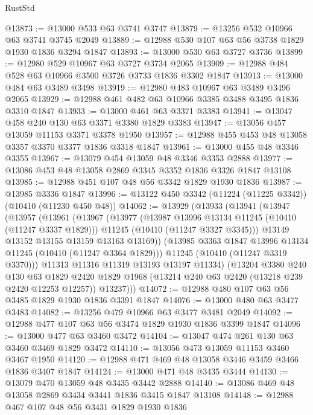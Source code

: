 \begin{lexlean}{RustStd}
\begin{coremodule}
@13873 := @13000 @533 @63 @3741 @3747
@13879 := @13256 @532 @10966 @63 @3741 @3745 @2049
@13889 := @12988 @530 @107 @63 @56 @3738 @1829 @1930 @1836 @3294 @1847
@13893 := @13000 @530 @63 @3727 @3736
@13899 := @12980 @529 @10967 @63 @3727 @3734 @2065
@13909 := @12988 @484 @528 @63 @10966 @3500 @3726 @3733 @1836 @3302 @1847
@13913 := @13000 @484 @63 @3489 @3498
@13919 := @12980 @483 @10967 @63 @3489 @3496 @2065
@13929 := @12988 @461 @482 @63 @10966 @3385 @3488 @3495 @1836 @3310 @1847
@13933 := @13000 @461 @63 @3371 @3383
@13941 := @13047 @458 @240 @130 @63 @3371 @3380 @1829 @3383
@13947 := @13056 @457 @13059 @11153 @3371 @3378 @1950
@13957 := @12988 @455 @453 @48 @13058 @3357 @3370 @3377 @1836 @3318 @1847
@13961 := @13000 @455 @48 @3346 @3355
@13967 := @13079 @454 @13059 @48 @3346 @3353 @2888
@13977 := @13086 @453 @48 @13058 @2869 @3345 @3352 @1836 @3326 @1847 @13108
@13985 := @12988 @451 @107 @48 @56 @3342 @1829 @1930 @1836
@13987 := @13985 @3336 @1847
@13996 := @13122 @450 @3342 (@11224 (@11225 @3342)) (@10410 (@11230 @450 @48))
@14062 := @13929
    (@13933
      (@13941
        (@13947
          (@13957
            (@13961
              (@13967
                (@13977
                  (@13987 @13996 @13134 @11245 (@10410 (@11247 @3337 @1829)))
                  @11245
                  (@10410 (@11247 @3327 @3345)))
                @13149
                @13152
                @13155
                @13159
                @13163
                @13169))
            (@13985 @3363 @1847 @13996 @13134 @11245 (@10410 (@11247 @3364 @1829)))
            @11245
            (@10410 (@11247 @3319 @3370)))
          @11313
          @11316
          @11319
          @13193
          @13197
          @11334)
        (@13204
          @3380
          @240
          @130
          @63
          @1829
          @2420
          @1829
          @1968
          (@13214 @240 @63 @2420 (@13218 @239 @2420 @12253 @12257))
          @13237)))
@14072 := @12988 @480 @107 @63 @56 @3485 @1829 @1930 @1836 @3391 @1847
@14076 := @13000 @480 @63 @3477 @3483
@14082 := @13256 @479 @10966 @63 @3477 @3481 @2049
@14092 := @12988 @477 @107 @63 @56 @3474 @1829 @1930 @1836 @3399 @1847
@14096 := @13000 @477 @63 @3460 @3472
@14104 := @13047 @474 @261 @130 @63 @3460 @3469 @1829 @3472
@14110 := @13056 @473 @13059 @11153 @3460 @3467 @1950
@14120 := @12988 @471 @469 @48 @13058 @3446 @3459 @3466 @1836 @3407 @1847
@14124 := @13000 @471 @48 @3435 @3444
@14130 := @13079 @470 @13059 @48 @3435 @3442 @2888
@14140 := @13086 @469 @48 @13058 @2869 @3434 @3441 @1836 @3415 @1847 @13108
@14148 := @12988 @467 @107 @48 @56 @3431 @1829 @1930 @1836

\end{coremodule}
\end{lexlean}
